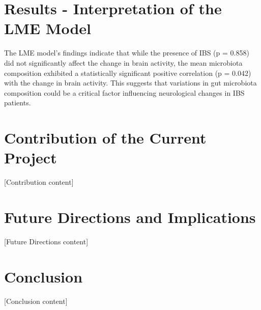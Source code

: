 \documentclass[11pt,a4paper]{article}
\begin{document}
\section{Results - Interpretation of the LME Model}
The LME model's findings indicate that while the presence of IBS (p = 0.858) did not significantly affect the change in brain activity, the mean microbiota composition exhibited a statistically significant positive correlation (p = 0.042) with the change in brain activity. This suggests that variations in gut microbiota composition could be a critical factor influencing neurological changes in IBS patients.

\section{Contribution of the Current Project}
[Contribution content]

\section{Future Directions and Implications}
[Future Directions content]

\section{Conclusion}
[Conclusion content]



\end{document}
